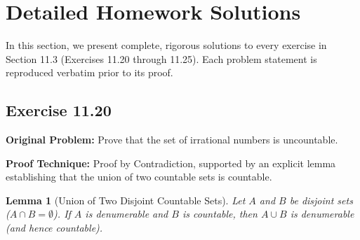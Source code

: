 \documentclass[11pt, letterpaper]{article}
\newtheorem{lemma}[theorem]{Lemma}
\theoremstyle{definition}
\theoremstyle{remark}
\begin{document}
\section{Detailed Homework Solutions}

In this section, we present complete, rigorous solutions to every exercise in Section 11.3 (Exercises 11.20 through 11.25). Each problem statement is reproduced verbatim prior to its proof.

\subsection{Exercise 11.20}

\textbf{Original Problem:} Prove that the set of irrational numbers is uncountable.

\medskip
\textbf{Proof Technique:} Proof by Contradiction, supported by an explicit lemma establishing that the union of two countable sets is countable.

\medskip
\begin{lemma}[Union of Two Disjoint Countable Sets]
Let $A$ and $B$ be disjoint sets ($A \cap B = \emptyset$). If $A$ is denumerable and $B$ is countable, then $A \cup B$ is denumerable (and hence countable).
\end{lemma}
\end{document}
